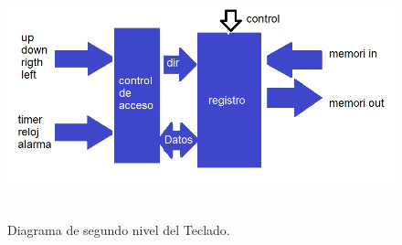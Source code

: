 \documentclass[12pt,a4paper]{article}
\begin{document}
\begin{figure}[htbp]
  \centering
    \includegraphics[height=7cm, width=16cm]{img/nivel2_contusr.jpg}
  \caption[1erNivel]{Diagrama de segundo nivel del Teclado.}
  \label{fig:SegundoNivelControlusr}
\end{figure}
\end{document}
